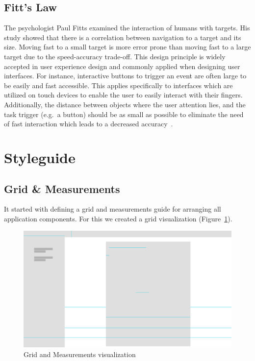 \subsection{Fitt's Law}\label{subsec:fitt's-law}
The psychologist Paul Fitts examined the interaction of humans with targets.
His study showed that there is a correlation between navigation to a target and its size.
Moving fast to a small target is more error prone than moving fast to a large target due to the speed-accuracy trade-off.
This design principle is widely accepted in user experience design and commonly applied when designing user interfaces.
For instance, interactive buttons to trigger an event are often large to be easily and fast accessible.
This applies specifically to interfaces which are utilized on touch devices to enable the user to easily interact with
their fingers.
Additionally, the distance between objects where the user attention lies, and the task trigger (e.g.\ a button) should be
as small as possible to eliminate the need of fast interaction which leads to a decreased accuracy~\cite{lawsofuxFL}.


\section{Styleguide}\label{sec:styleguide}

\subsection{Grid \& Measurements}\label{subsec:grid-and-measurements}

It started with defining a grid and measurements guide for arranging all application components. For this we created a
grid visualization (Figure~\ref{fig:grid}).

\begin{figure}[!ht]
    \centering
    \includegraphics[width=1.0\textwidth]{./images/grid.pdf}
    \caption{Grid and Measurements visualization}
    \label{fig:grid}
\end{figure}

